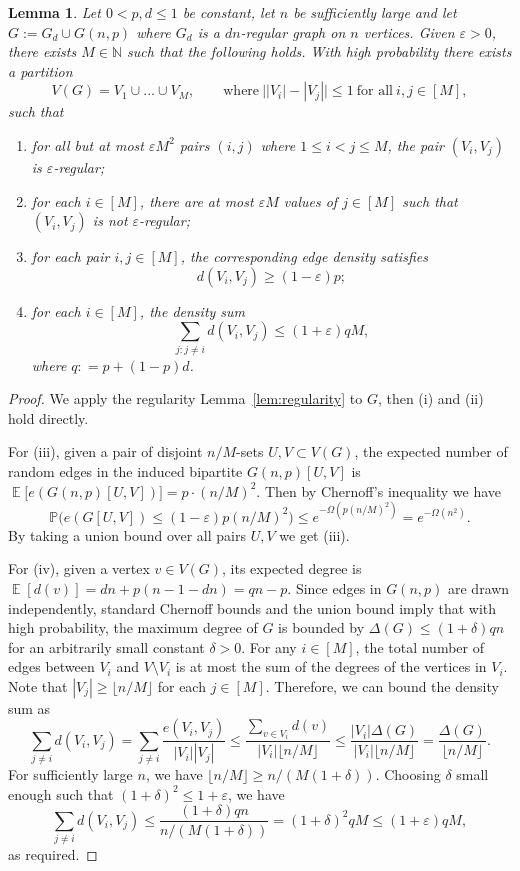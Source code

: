 \documentclass[11pt,reqno]{amsart}
\newtheorem{lemma}[theorem]{Lemma}
\theoremstyle{definition}
\theoremstyle{remark}
\newcommand\E{\operatorname{\mathbb{E}}}
\renewcommand\leq{\leqslant}
\renewcommand\geq{\geqslant}
\renewcommand\le{\leqslant}
\renewcommand\ge{\geqslant}
\def\Prob{\mathbb{P}}
\begin{document}
\begin{lemma}\label{lem:Gpartition}
Let $0<p,d\leq 1$ be constant, let $n$ be sufficiently large and let $G:=G_d\cup G(n,p)$ where $G_d$ is a $dn$-regular graph on $n$ vertices. Given $\varepsilon>0$, there exists $M\in\mathbb{N}$ such that the following holds. With high probability there exists a partition 
$$V(G)=V_1\cup...\cup V_M,\qquad\text{where}\ \big||V_i|-|V_j|\big|\leq 1\ \text{for all}\ i,j\in[M],$$ 
such that 
\begin{enumerate}
    \item[(i)] for all but at most $\varepsilon M^2$ pairs $(i,j)$ where $1\le i<j\le M$, the pair $(V_i,V_j)$ is $\varepsilon$-regular;

    \item[(ii)] for each $i\in [M]$, there are at most $\varepsilon M$ values of $j\in [M]$ such that $(V_i,V_j)$ is not $\varepsilon$-regular;

    \item[(iii)] for each pair $i,j\in [M]$, the corresponding edge density satisfies
    $$d(V_i,V_j)\geq (1-\varepsilon)p;$$

    \item[(iv)]  for each $i\in [M]$, the density sum 
    $$\sum_{j: j\neq i}d(V_i,V_j)\leq (1+\varepsilon)qM,$$ where $q: = p+(1-p)d$.
\end{enumerate}
\end{lemma}
\begin{proof}
We apply the regularity Lemma~\ref{lem:regularity} to $G$, then (i) and (ii) hold directly. 

For (iii), given a pair of disjoint $n/M$-sets $U,V\subset V(G)$, the expected number of random edges in the induced bipartite $G(n,p)[U,V]$ is $\E\big[e(G(n,p)[U,V])\big]=p\cdot(n/M)^2$. Then by Chernoff's inequality we have
$$\Prob\Big(e(G[U,V])\leq (1-\varepsilon)p(n/M)^2\Big)\leq e^{-\Omega(p(n/M)^2)}=e^{-\Omega(n^2)}.$$
By taking a union bound over all pairs $U,V$ we get (iii).

For (iv), given a vertex $v \in V(G)$, its expected degree is $\E[d(v)] = dn + p(n - 1 - dn) = qn - p$. Since edges in $G(n,p)$ are drawn independently, standard Chernoff bounds and the union bound imply that with high probability, the maximum degree of $G$ is bounded by $\Delta(G) \le (1 + \delta)qn$ for an arbitrarily small constant $\delta > 0$. For any $i \in [M]$, the total number of edges between $V_i$ and $V \setminus V_i$ is at most the sum of the degrees of the vertices in $V_i$. Note that $|V_j| \ge \lfloor n/M \rfloor$ for each $j\in [M]$. Therefore, we can bound the density sum as 
$$\sum_{j \neq i} d(V_i, V_j) = \sum_{j \neq i} \frac{e(V_i, V_j)}{|V_i||V_j|} \le \frac{\sum_{v \in V_i} d(v)}{|V_i| \lfloor n/M \rfloor} \le \frac{|V_i| \Delta(G)}{|V_i| \lfloor n/M \rfloor} = \frac{\Delta(G)}{\lfloor n/M \rfloor}.$$
For sufficiently large $n$, we have $\lfloor n/M \rfloor \ge n / (M(1+\delta))$. Choosing $\delta$ small enough such that $(1+\delta)^2 \le 1+\varepsilon$, we have
$$\sum_{j \neq i} d(V_i, V_j) \le \frac{(1+\delta)qn}{n / (M(1+\delta))} = (1+\delta)^2 qM \le (1+\varepsilon)qM,$$
as required.
\end{proof}
\end{document}
